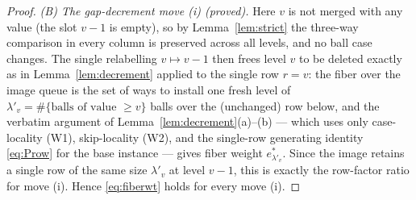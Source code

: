 \begin{proof}
\emph{(B) The gap-decrement move \textup{(i)} (proved).} Here $v$ is not merged with
any value (the slot $v-1$ is empty), so by Lemma~\ref{lem:strict} the three-way
comparison in every column is preserved across all levels, and no ball case changes.
The single relabelling $v\mapsto v-1$ then frees level $v$ to be deleted exactly as in
Lemma~\ref{lem:decrement} applied to the single row $r=v$: the fiber over the image
queue is the set of ways to install one fresh level of
$\lambda'_v=\#\{\text{balls of value }\ge v\}$ balls over the (unchanged) row below,
and the verbatim argument of Lemma~\ref{lem:decrement}(a)--(b) --- which uses only
case-locality (W1), skip-locality (W2), and the single-row generating identity
\eqref{eq:Prow} for the base instance --- gives fiber weight $e^*_{\lambda'_v}$. Since
the image retains a single row of the same size $\lambda'_v$ at level $v-1$, this is
exactly the row-factor ratio for move \textup{(i)}. Hence \eqref{eq:fiberwt} holds for
every move \textup{(i)}.


\end{proof}
